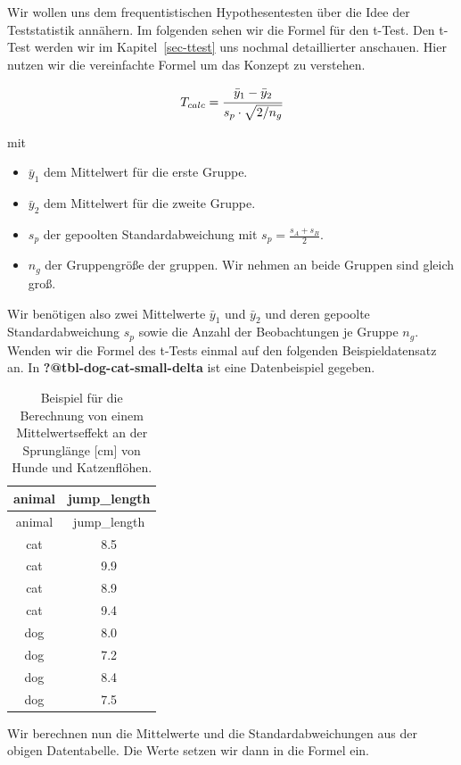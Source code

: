 \documentclass[
  letterpaper,
  DIV=11,
  oneside]{scrreport}
\providecommand{\tightlist}{%
  \setlength{\itemsep}{0pt}\setlength{\parskip}{0pt}}\usepackage{longtable,booktabs,array}
\begin{document}
Wir wollen uns dem frequentistischen Hypothesentesten über die Idee der
Teststatistik annähern. Im folgenden sehen wir die Formel für den
t-Test. Den t-Test werden wir im Kapitel~\ref{sec-ttest} uns nochmal
detaillierter anschauen. Hier nutzen wir die vereinfachte Formel um das
Konzept zu verstehen.

\[
T_{calc}=\cfrac{\bar{y}_1-\bar{y}_2}{s_{p} \cdot \sqrt{2/n_g}}
\]

mit

\begin{itemize}
\tightlist
\item
  \(\bar{y}_1\) dem Mittelwert für die erste Gruppe.
\item
  \(\bar{y}_2\) dem Mittelwert für die zweite Gruppe.
\item
  \(s_{p}\) der gepoolten Standardabweichung mit
  \(s_p = \tfrac{s_A + s_B}{2}\).
\item
  \(n_g\) der Gruppengröße der gruppen. Wir nehmen an beide Gruppen sind
  gleich groß.
\end{itemize}

Wir benötigen also zwei Mittelwerte \(\bar{y}_1\) und \(\bar{y}_2\) und
deren gepoolte Standardabweichung \(s_p\) sowie die Anzahl der
Beobachtungen je Gruppe \(n_g\). Wenden wir die Formel des t-Tests
einmal auf den folgenden Beispieldatensatz an. In
\textbf{?@tbl-dog-cat-small-delta} ist eine Datenbeispiel gegeben.

\hypertarget{tbl-dog-cat-small}{}
\begin{longtable}[]{@{}cc@{}}
\caption{\label{tbl-dog-cat-small}Beispiel für die Berechnung von einem
Mittelwertseffekt an der Sprunglänge {[}cm{]} von Hunde und
Katzenflöhen.}\tabularnewline
\toprule()
animal & jump\_length \\
\midrule()
\endfirsthead
\toprule()
animal & jump\_length \\
\midrule()
\endhead
cat & 8.5 \\
cat & 9.9 \\
cat & 8.9 \\
cat & 9.4 \\
dog & 8.0 \\
dog & 7.2 \\
dog & 8.4 \\
dog & 7.5 \\
\bottomrule()
\end{longtable}

Wir berechnen nun die Mittelwerte und die Standardabweichungen aus der
obigen Datentabelle. Die Werte setzen wir dann in die Formel ein.
\end{document}
